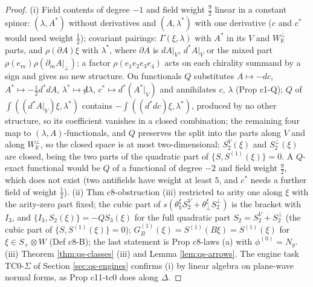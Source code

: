 \documentclass[11pt]{article}
\numberwithin{equation}{section}
\theoremstyle{plain}
\theoremstyle{definition}
\begin{document}
\begin{proof}
(i) Field contents of degree $-1$ and field weight $\tfrac92$ linear in a constant spinor: $(\lambda,A^*)$ without derivatives and $(A,\lambda^*)$ with one derivative ($c$ and $c^*$ would need weight $\tfrac12$); covariant pairings: $\Gamma(\xi,\lambda)$ with $A^*$ in its $V$ and $W^\perp_{\mathbb R}$ parts, and $\rho(\partial A)\xi$ with $\lambda^*$, where $\partial A$ is $dA|_V$, $d^*A|_V$ or the mixed part $\rho(e_m)\rho(\partial_mA|_\perp)$; a factor $\rho(e_1e_2e_3e_4)$ acts on each chirality summand by a sign and gives no new structure. On functionals $Q$ substitutes $A\mapsto-dc$, $A^*\mapsto-\tfrac12d^*dA$, $\lambda^*\mapsto{\not d}\lambda$, $c^*\mapsto d^*(A^*|_V)$ and annihilates $c$, $\lambda$ (Prop c1-Q); $Q$ of $\int((d^*A|_V)\xi,\lambda^*)$ contains $-\int((d^*dc)\xi,\lambda^*)$, produced by no other structure, so its coefficient vanishes in a closed combination; the remaining four map to $(\lambda,A)$-functionals, and $Q$ preserves the split into the parts along $V$ and along $W^\perp_{\mathbb R}$, so the closed space is at most two-dimensional; $S^V_2(\xi)$ and $S^\perp_2(\xi)$ are closed, being the two parts of the quadratic part of $\{S,S^{(1)}(\xi)\}=0$. A $Q$-exact functional would be $Q$ of a functional of degree $-2$ and field weight $\tfrac92$, which does not exist (two antifields have weight at least $5$, and $c^*$ needs a further field of weight $\tfrac12$). (ii) Thm c8-obstruction (iii) restricted to arity one along $\xi$ with the arity-zero part fixed; the cubic part of $s(\theta^\xi_VS^V_2+\theta^\xi_\perp S^\perp_2)$ is the bracket with $I_3$, and $\{I_3,S_2(\xi)\}=-QS_3(\xi)$ for the full quadratic part $S_2=S^V_2+S^\perp_2$ (the cubic part of $\{S,S^{(1)}(\xi)\}=0$); $G_B^{(1)}(\xi)=S^{(1)}(B\xi)=S^{(1)}(\xi)$ for $\xi\in S_+\otimes W$ (Def c8-B); the last statement is Prop c8-laws (a) with $\phi^{(0)}=N_y$. (iii) Theorem \ref{thm:qs-classes} (iii) and Lemma \ref{lem:qs-arrows}. The engine task TC0-$\Sigma$ of Section \ref{sec:qs-engines} confirms (i) by linear algebra on plane-wave normal forms, as Prop c11-tc0 does along $\Delta$.
\end{proof}
\end{document}
